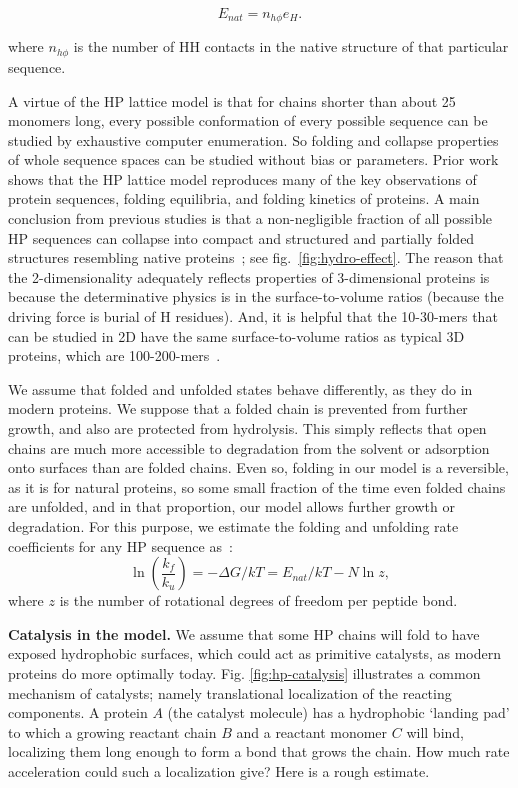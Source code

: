 \documentclass[5p,times]{elsarticle}
\newcommand*{\gD}{\Delta}
\newcommand*{\pt}[1]{\left( #1\right)}
\begin{document}
\begin{equation}
 E_{nat}=n_{h\phi}e_H.
\end{equation} 

 where $n_{h\phi}$ is the number of HH contacts in the native structure of that particular 
sequence.  
 
 A virtue of the HP lattice model is that for chains shorter than about 25 monomers long, every 
possible conformation of every possible sequence can be studied by exhaustive computer enumeration. 
 So folding and collapse properties of whole sequence spaces can be studied without bias or 
parameters.  Prior work shows that the HP lattice model reproduces many of the key observations of 
protein sequences, folding equilibria, and folding kinetics of proteins\cite{Dill1999}.  A main 
conclusion from previous studies is 
that a non-negligible fraction of all possible HP sequences can collapse into compact and 
structured and partially folded structures resembling native proteins~\cite{lau1989lattice}; see 
fig.~\ref{fig:hydro-effect}.  The reason that the 2-dimensionality adequately reflects properties 
of 3-dimensional proteins is because the determinative physics is in the surface-to-volume ratios 
(because the driving force is burial of H residues).  And, it is helpful that the 10-30-mers that 
can be studied in 2D have the same surface-to-volume ratios as typical 3D proteins, which are 
100-200-mers~\cite{Giugliarelli2000}.


 We assume that folded and unfolded states behave differently, as they do in modern proteins.  We 
suppose that a folded chain is prevented from further growth, and also are protected from 
hydrolysis.  This simply reflects that open chains are much more accessible to degradation from the 
solvent or adsorption onto surfaces than are folded chains.  Even so, folding in our model is a 
reversible, as it is for natural proteins, so some small fraction of the time even folded chains 
are unfolded, and in that proportion, our model allows further growth or degradation.  For this 
purpose, we estimate the folding and unfolding rate coefficients for any HP sequence 
as~\cite{Ghosh2009}:
\begin{equation}
 \ln\pt{\frac{k_f}{k_u}}=-\gD G/kT = E_{nat}/kT-N\ln z,
\end{equation} 
 where $z$ is the number of rotational degrees of freedom per peptide bond.
 

\textbf{Catalysis in the model.}  We assume that some HP chains will fold to have exposed 
hydrophobic surfaces, which could 
act as primitive catalysts, as modern proteins do more optimally today.  Fig. 
\ref{fig:hp-catalysis} illustrates a common mechanism of catalysts; namely translational 
localization of the reacting components.  A protein $A$ (the catalyst molecule) has a hydrophobic 
`landing pad' to which a growing reactant chain $B$ and a reactant monomer $C$ will bind, 
localizing 
them long enough to form a bond that grows the chain.  How much rate acceleration could such a 
localization give?  Here is a rough estimate.  
\end{document}
